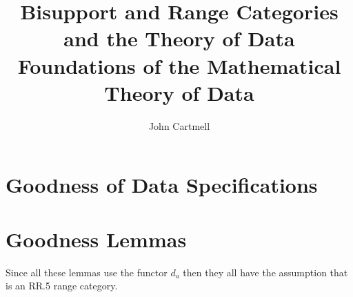 \documentclass[10pt,a4paper]{article}
\theoremstyle{remark}
\newcommand{\srcFolder}{src}
\begin{document}
\title{Bisupport and Range Categories and the Theory of Data\\[0.5em]
\large Foundations of the Mathematical Theory of Data}

\author{John Cartmell}
\date{}
\maketitle
\newcommand{\Fquotient}{F/\!\!\sim}  %

\newcommand{\IfSforCwithRCwords}{If $S$ is a sketch for category \catcw and if $S$ is considered as a data specification with requirement $\reqtc$\ }


\tableofcontents











 






\section{Goodness of Data Specifications}



\section{Goodness Lemmas}
\begin{aside}
Since all these lemmas use the functor $d_a$ then they all have the assumption that
\catcw is an RR.5 range category.
\end{aside}







 


\printindex[lemmas]
\end{document}
